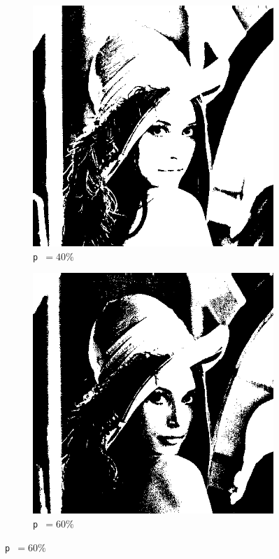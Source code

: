 \documentclass[12pt]{article}
\begin{document}
\begin{figure}[H]
      \vspace{0.02\textwidth}

      \begin{subfigure}[b]{0.33\textwidth}
        \centering
        \includegraphics[width=\textwidth]{img/lena-threshold-40.png}
        \caption*{\texttt{p }\( = 40\%\)}
      \end{subfigure}
      \hspace{0.15\textwidth}
      \begin{subfigure}[b]{0.33\textwidth}
        \centering
        \includegraphics[width=\textwidth]{img/lena-threshold-60.png}
        \caption*{\texttt{p }\( = 60\%\)}
      \end{subfigure}


\end{figure}
\end{document}
